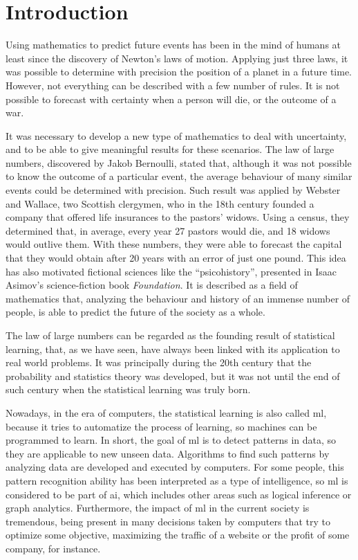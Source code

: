 
\chapter{Introduction} %
\label{Chapter1}



Using mathematics to predict future events has been in the mind of humans at least since the discovery of Newton's laws of motion. Applying just three laws, it was possible to determine with precision the position of a planet in a future time. However, not everything can be described with a few number of rules. It is not possible to forecast with certainty when a person will die, or the outcome of a war.

It was necessary to develop a new type of mathematics to deal with uncertainty, and to be able to give meaningful results for these scenarios. The law of large numbers, discovered by Jakob Bernoulli, stated that, although it was not possible to know the outcome of a particular event, the average behaviour of many similar events could be determined with precision. 
%
Such result was applied by Webster and Wallace, two Scottish clergymen, who in the 18th century founded a company that offered life insurances to the pastors' widows. Using a census, they determined that, in average, every year 27 pastors would die, and 18 widows would outlive them. With these numbers, they were able to forecast the capital that they would obtain after 20 years with an error of just one pound.
%
This idea has also motivated fictional sciences like the ``psicohistory'', presented in Isaac Asimov's science-fiction book \emph{Foundation}. It is described as a field of mathematics that, analyzing the behaviour and history of an immense number of people, is able to predict the future of the society as a whole. 

The law of large numbers can be regarded as the founding result of statistical learning, that, as we have seen, have always been linked with its application to real world problems. It was principally during the 20th century that the probability and statistics theory was developed, but it was not until the end of such century when the statistical learning was truly born.

Nowadays, in the era of computers, the statistical learning is also called \acrfull{ml}, because it tries to automatize the process of learning, so machines can be programmed to learn. In short, the goal of \acrshort{ml} is to detect patterns in data, so they are applicable to new unseen data. Algorithms to find such patterns by analyzing data are developed and executed by computers.
%
For some people, this pattern recognition ability has been interpreted as a type of intelligence, so \acrshort{ml} is considered to be part of \acrfull{ai}, which includes other areas such as logical inference or graph analytics.
%
Furthermore, the impact of \acrshort{ml} in the current society is tremendous, being present in many decisions taken by computers that try to optimize some objective, maximizing the traffic of a website or the profit of some company, for instance.

